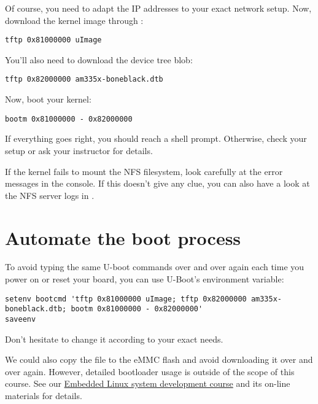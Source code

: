 Of course, you need to adapt the IP addresses to your exact network
setup. Now, download the kernel image through :

\begin{verbatim}
tftp 0x81000000 uImage
\end{verbatim}

You'll also need to download the device tree blob:

\begin{verbatim}
tftp 0x82000000 am335x-boneblack.dtb
\end{verbatim}

Now, boot your kernel:

\begin{verbatim}
bootm 0x81000000 - 0x82000000
\end{verbatim}

If everything goes right, you should reach a shell prompt. Otherwise,
check your setup or ask your instructor for details.

If the kernel fails to mount the NFS filesystem, look carefully at the
error messages in the console. If this doesn't give any clue, you can
also have a look at the NFS server logs in .

\section{Automate the boot process}

To avoid typing the same U-boot commands over and over again each time
you power on or reset your board, you can use U-Boot's 
environment variable:

{\scriptsize
\begin{verbatim}
setenv bootcmd 'tftp 0x81000000 uImage; tftp 0x82000000 am335x-boneblack.dtb; bootm 0x81000000 - 0x82000000'
saveenv
\end{verbatim}
}

Don't hesitate to change it according to your exact needs.

We could also copy the  file to the eMMC flash and avoid
downloading it over and over again. However, detailed bootloader
usage is outside of the scope of this course. See our
\href{http://free-electrons.com/training/embedded-linux/}{Embedded
Linux system development course} and its on-line materials for
details.
